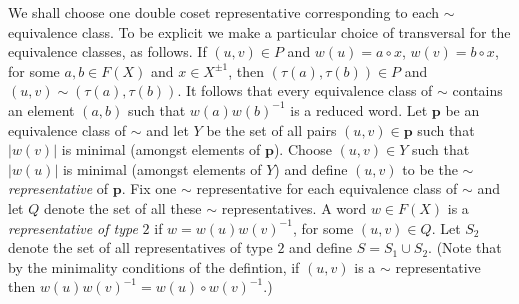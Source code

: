 \documentclass[a4paper,12pt]{article}
\def\t{\tau }
\newcommand{\pp}{\mathbf{p}}
\numberwithin{equation}{section}
\numberwithin{figure}{section}
\begin{document}
We shall choose one double coset representative corresponding to each $\sim$ 
equivalence class. To be explicit we make a particular choice of transversal
for the equivalence classes, as follows. 
If $(u,v)\in P$ and $w(u)=a\circ x$, $w(v)=b\circ x$, for some $a,b\in F(X)$ and 
$x\in X^{\pm 1}$, then $(\t(a),\t(b))\in P$ and $(u,v)\sim (\t(a),\t(b))$. It follows
that every equivalence class of $\sim$ contains an element $(a,b)$ such that
$w(a)w(b)^{-1}$ is a reduced word. Let $\pp$ be an equivalence class of $\sim$ and
let $Y$ be the set of all pairs $(u,v)\in \pp$ such that $|w(v)|$ is minimal (amongst
elements of $\pp$). Choose $(u,v)\in Y$ such that $|w(u)|$ is minimal (amongst elements
of $Y$) and define $(u,v)$ to be the $\sim${\em representative} of $\pp$. Fix
one $\sim$ representative for each equivalence class of $\sim$ and  
let $Q$ denote the set of  all these $\sim$ representatives. A word $w\in F(X)$ is
 a {\em representative of type} $2$ if $w=w(u)w(v)^{-1}$, for some $(u,v)\in Q$. 
Let $S_2$ denote the set of all representatives of type $2$ and define $S=S_1\cup S_2$.
(Note that by the minimality conditions of the defintion, if $(u,v)$ is a 
$\sim$ representative then $w(u)w(v)^{-1}=w(u)\circ w(v)^{-1}$.)
\end{document}

